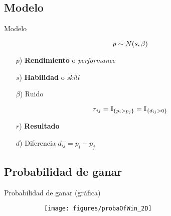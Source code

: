 \documentclass[shownotes]{beamer}
\begin{document}
\subsection{Modelo}

\begin{frame}

\begin{center}
 \Large Modelo
\end{center}


\begin{equation}
 \large p \sim N(s,\beta)
\end{equation}

\begin{itemize} \normalsize
 \item[$p$)]  \textbf{Rendimiento} o \emph{performance}
 \item[$s$)]  \textbf{Habilidad} o \emph{skill}
 \item[$\beta$)] Ruido 
\end{itemize}

\begin{equation}
 \large r_{ij} = \mathbb{I}_{\{p_i > p_j \}} = \mathbb{I}_{\{d_{ij} > 0 \}}
\end{equation}

\begin{itemize} \normalsize
 \item[$r$)]  \textbf{Resultado}
 \item[$d$)]  Diferencia $d_{ij} = p_i - p_j$
\end{itemize}


\end{frame}



\subsection{Probabilidad de ganar}


\begin{frame}

\begin{center}
 \large Probabilidad de ganar (gr\'afica)
\end{center}
\vspace{-0.3cm}
\begin{figure}[H]     
     \centering
     \begin{subfigure}[b]{0.7\textwidth}
       \texttt{[image: figures/probaOfWin\_2D]} 
     \end{subfigure}
  \end{figure}

\end{frame}
\end{document}
